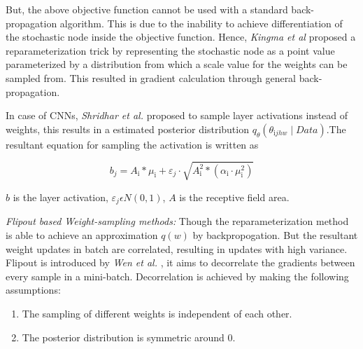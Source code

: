 \documentclass[10pt,twocolumn,letterpaper]{article}
\begin{document}
        

But, the above objective function cannot be used with a standard back-propagation algorithm. This is due to the inability to achieve differentiation of the stochastic node inside the objective function. Hence, \textit{Kingma et al} \cite{Kingma2015} proposed a reparameterization trick by representing the stochastic node as a point value parameterized by a distribution from which a scale value for the weights can be sampled from. This resulted in gradient calculation through general back-propagation. 

In case of CNNs, \textit{Shridhar et al.} proposed to sample layer activations instead of weights, this results in a estimated posterior distribution $q_{\theta}\left(\theta_{\mathrm{i} j h w} \mid D a t a\right)$.The resultant equation for sampling the activation is written as 
        
\begin{equation}b_{j}=A_{\mathrm{i}} * \mu_{\mathrm{i}}+\varepsilon_{j} \cdot \sqrt{A_{\mathrm{i}}^{2} *\left(\alpha_{\mathrm{i}} \cdot \mu_{\mathrm{i}}^{2}\right)}\end{equation}

$b$ is the layer activation, $\varepsilon_{j} \epsilon N(0,1)$, $ A $ is the receptive field area.

\textit{Flipout based Weight-sampling methods:}
Though the reparameterization method is able to achieve an approximation $q(w)$ by backpropogation. But the resultant weight updates in batch are correlated, resulting in updates with high variance. Flipout is introduced by \textit{Wen et al.} \cite{Wen2018}, it aims to decorrelate the gradients between every sample in a mini-batch. Decorrelation is achieved by making the following assumptions:
\begin{enumerate}
 \item The sampling of different weights is independent of each other. 
 \item The posterior distribution is symmetric around 0. 
\end{enumerate}
\end{document}
